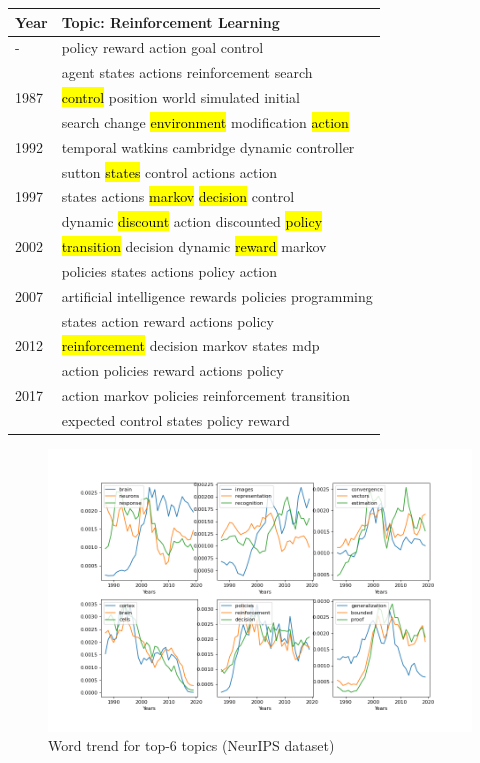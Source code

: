 \begin{table}[h]
\centering
\begin{tabular}{ll}
\hline
Year&Topic: Reinforcement Learning\\ \hline
-&policy reward action goal control \\
&agent states actions reinforcement search\\
1987 &\hl{control} position world simulated initial \\
&search change \hl{environment} modification \hl{action}\\
1992 &temporal watkins cambridge dynamic controller \\
&sutton \hl{states} control actions action\\
1997 &states actions \hl{markov} \hl{decision} control \\
&dynamic \hl{discount} action discounted \hl{policy}\\
2002 &\hl{transition} decision dynamic \hl{reward} markov \\
&policies states actions policy action\\
2007 &artiﬁcial intelligence rewards policies programming \\
&states action reward actions policy\\
2012 &\hl{reinforcement} decision markov states mdp \\
&action policies reward actions policy\\
2017 &action markov policies reinforcement transition \\
&expected control states policy reward\\
\hline
\end{tabular}
\end{table}
\begin{figure}
\centering
\includegraphics[width=1\linewidth]{figures/1128/scatter(2)}
\caption{Word trend for top-6 topics (NeurIPS dataset)}
\label{fig:scatter2}
\end{figure}

